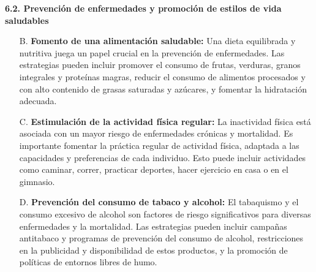 \documentclass[8pt,a4paper]{beamer}
\begin{document}
{\begin{frame}{}
\begin{block}{\textbf{6.2. Prevención de enfermedades y promoción de estilos de vida saludables}}
\begin{enumerate}
\item[B.] \textbf{Fomento de una alimentación saludable:} Una dieta equilibrada y nutritiva juega un papel crucial en la prevención de enfermedades. Las estrategias pueden incluir promover el consumo de frutas, verduras, granos integrales y proteínas magras, reducir el consumo de alimentos procesados y con alto contenido de grasas saturadas y azúcares, y fomentar la hidratación adecuada.
\end{enumerate}
\end{block}
\end{frame}


\begin{frame}{}
\begin{block}{}
\setlength{\parskip}{3px}
\justifying
\begin{enumerate}
\setlength{\parskip}{3px}
\justifying
\item[C.] \textbf{Estimulación de la actividad física regular:} La inactividad física está asociada con un mayor riesgo de enfermedades crónicas y mortalidad. Es importante fomentar la práctica regular de actividad física, adaptada a las capacidades y preferencias de cada individuo. Esto puede incluir actividades como caminar, correr, practicar deportes, hacer ejercicio en casa o en el gimnasio.

\item[D.] \textbf{Prevención del consumo de tabaco y alcohol:} El tabaquismo y el consumo excesivo de alcohol son factores de riesgo significativos para diversas enfermedades y la mortalidad. Las estrategias pueden incluir campañas antitabaco y programas de prevención del consumo de alcohol, restricciones en la publicidad y disponibilidad de estos productos, y la promoción de políticas de entornos libres de humo.
\end{enumerate}
\end{block}
\end{frame}

}
\end{document}
